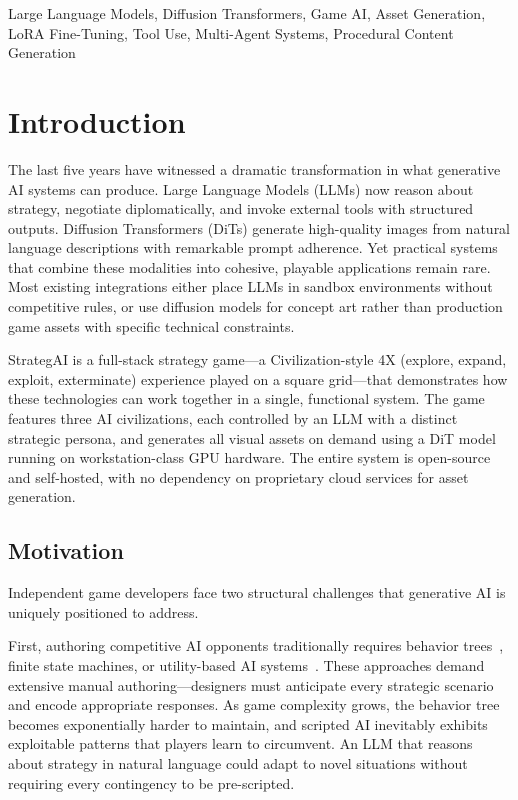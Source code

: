 \documentclass[conference]{IEEEtran}
\begin{document}
\begin{IEEEkeywords}
Large Language Models, Diffusion Transformers, Game AI, Asset Generation,
LoRA Fine-Tuning, Tool Use, Multi-Agent Systems, Procedural Content Generation
\end{IEEEkeywords}

\section{Introduction}
\label{sec:introduction}

The last five years have witnessed a dramatic transformation in what
generative AI systems can produce. Large Language Models (LLMs) now reason
about strategy, negotiate diplomatically, and invoke external tools with
structured outputs. Diffusion Transformers (DiTs) generate high-quality
images from natural language descriptions with remarkable prompt adherence.
Yet practical systems that combine these modalities into cohesive, playable
applications remain rare. Most existing integrations either place LLMs in
sandbox environments without competitive rules, or use diffusion models for
concept art rather than production game assets with specific technical
constraints.

StrategAI is a full-stack strategy game---a Civilization-style 4X
(explore, expand, exploit, exterminate) experience played on a square
grid---that demonstrates how these technologies can work together in a
single, functional system. The game features three AI civilizations, each
controlled by an LLM with a distinct strategic persona, and generates all
visual assets on demand using a DiT model running on workstation-class GPU
hardware. The entire system is open-source and self-hosted, with no
dependency on proprietary cloud services for asset generation.

\subsection{Motivation}
\label{sec:motivation}

Independent game developers face two structural challenges that generative
AI is uniquely positioned to address.

First, authoring competitive AI opponents traditionally requires behavior
trees~\cite{simpson2014behaviortrees}, finite state machines, or
utility-based AI systems~\cite{rabin2013gameaipro}. These approaches demand
extensive manual authoring---designers must anticipate every strategic
scenario and encode appropriate responses. As game complexity grows, the
behavior tree becomes exponentially harder to maintain, and scripted AI
inevitably exhibits exploitable patterns that players learn to circumvent.
An LLM that reasons about strategy in natural language could adapt to novel
situations without requiring every contingency to be pre-scripted.
\end{document}
